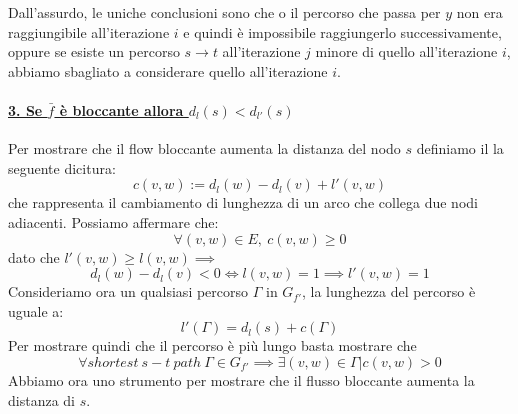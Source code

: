             Dall'assurdo, le uniche conclusioni sono che o il percorso che passa per $y$ non era raggiungibile all'iterazione $i$ e quindi è impossibile raggiungerlo successivamente, 
            oppure se esiste un percorso $s\rightarrow t$ all'iterazione $j$ minore di quello all'iterazione $i$, abbiamo sbagliato a considerare quello all'iterazione $i$.

        
            \paragraph*{\underline{3. Se $\bar{f}$ è bloccante allora $d_l(s) < d_{l'}(s)$}}

            Per mostrare che il flow bloccante aumenta la distanza del nodo $s$ definiamo il la seguente dicitura:
            \[c(v,w):= d_l(w)-d_l(v) + l'(v,w)\]
            che rappresenta il cambiamento di lunghezza di un arco che collega due nodi adiacenti.
            Possiamo affermare che:
            \[\forall (v,w)\in E,\ c(v,w)\ge 0\]
            dato che $l'(v,w)\ge l(v,w)\implies$
            \[ d_l(w)-d_l(v) < 0 \iff l(v,w) = 1 \implies l'(v,w) = 1\]
            Consideriamo ora un qualsiasi percorso $\Gamma$ in $G_{f'}$, la lunghezza del percorso è uguale a: 
            \[l'(\Gamma) = d_l(s)+c(\Gamma)\]
            Per mostrare quindi che il percorso è più lungo basta mostrare che 
            \[\forall shortest\ s-t\ path\ \Gamma \in G_{f'}\implies \exists (v,w)\in \Gamma | c(v,w) > 0\]
            Abbiamo ora uno strumento per mostrare che il flusso bloccante aumenta la distanza di $s$.


